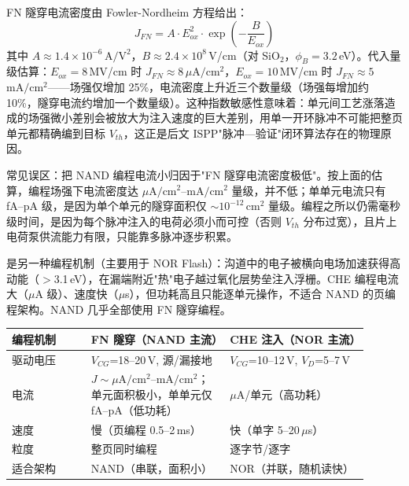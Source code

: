 FN 隧穿电流密度由 Fowler-Nordheim 方程给出：
$$J_{FN} = A \cdot E_{ox}^2 \cdot \exp\!\left(-\frac{B}{E_{ox}}\right)$$
其中 $A \approx 1.4 \times 10^{-6}$\,$\mathrm{A/V^2}$，$B \approx 2.4 \times 10^{8}$\,V/cm（对 SiO$_2$，$\phi_B = 3.2$\,eV）。代入量级估算：$E_{ox} = 8$\,MV/cm 时 $J_{FN} \approx 8$\,$\mu\mathrm{A/cm^2}$，$E_{ox} = 10$\,MV/cm 时 $J_{FN} \approx 5$\,$\mathrm{mA/cm^2}$——场强仅增加 25\%，电流密度上升近三个数量级（场强每增加约 10\%，隧穿电流约增加一个数量级）。这种指数敏感性意味着：单元间工艺涨落造成的场强微小差别会被放大为注入速度的巨大差别，用单一开环脉冲不可能把整页单元都精确编到目标 $V_{th}$，这正是后文 ISPP"脉冲—验证"闭环算法存在的物理原因。

\begin{warningbox}
常见误区：把 NAND 编程电流小归因于"FN 隧穿电流密度极低"。按上面的估算，编程场强下电流密度达 $\mu\mathrm{A/cm^2}$--$\mathrm{mA/cm^2}$ 量级，并不低；单单元电流只有 fA--pA 级，是因为单个单元的隧穿面积仅 $\sim$$10^{-12}$\,$\mathrm{cm^2}$ 量级。编程之所以仍需毫秒级时间，是因为每个脉冲注入的电荷必须小而可控（否则 $V_{th}$ 分布过宽），且片上电荷泵供流能力有限，只能靠多脉冲逐步积累。
\end{warningbox}

是另一种编程机制（主要用于 NOR Flash）：沟道中的电子被横向电场加速获得高动能（$>$3.1\,eV），在漏端附近"热"电子越过氧化层势垒注入浮栅。CHE 编程电流大（$\mu$A 级）、速度快（$\mu$s），但功耗高且只能逐单元操作，不适合 NAND 的页编程架构。NAND 几乎全部使用 FN 隧穿编程。

\begin{longtable}{L{0.2\linewidth}L{0.35\linewidth}L{0.35\linewidth}}
\toprule
编程机制 & FN 隧穿（NAND 主流） & CHE 注入（NOR 主流） \\
\midrule
驱动电压 & $V_{CG}$=18--20\,V, 源/漏接地 & $V_{CG}$=10--12\,V, $V_D$=5--7\,V \\
电流 & $J \sim \mu\mathrm{A/cm^2}$--$\mathrm{mA/cm^2}$；单元面积极小，单单元仅 fA--pA（低功耗） & $\mu$A/单元（高功耗） \\
速度 & 慢（页编程 0.5--2\,ms） & 快（单字 5--20\,$\mu$s） \\
粒度 & 整页同时编程 & 逐字节/逐字 \\
适合架构 & NAND（串联，面积小） & NOR（并联，随机读快） \\
\bottomrule
\end{longtable}


